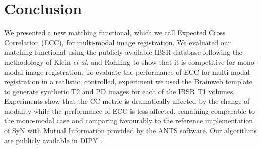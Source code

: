\section{Conclusion}
We presented a new matching functional, which we call Expected Cross Correlation (ECC), for multi-modal image registration. We evaluated our matching functional using the publicly available IBSR database following the methodology of Klein {\it et al.}\cite{Klein2009, Klein2010} and Rohlfing \cite{Rohlfing2012} to show that it is competitive for mono-modal image registration. To evaluate the performance of ECC for multi-modal registration in a realistic, controlled, experiment we used the Brainweb \citep{Cocosco1997, Kwan1999} template to generate synthetic T2 and PD images for each of the IBSR T1 volumes. Experiments show that the CC metric is dramatically affected by the change of modality while the performance of ECC is less affected, remaining comparable to the mono-modal case and comparing favourably to the reference implementation of SyN with Mutual Information provided by the ANTS software. Our algorithms are publicly available in DIPY \citep{Garyfallidis2014}.\\

